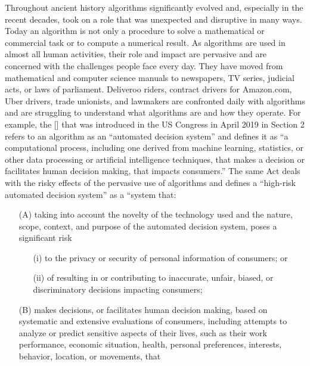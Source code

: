 {{{Throughout ancient history algorithms significantly evolved and, especially in the recent decades, took on a role that was unexpected and disruptive in many ways. Today an algorithm is not only a procedure to solve a mathematical or commercial task or to compute a numerical result. As algorithms are used in almost all human activities, their role and impact are pervasive and are concerned with the challenges people face every day. They have moved from mathematical and computer science manuals to newspapers, TV series, judicial acts, or laws of parliament. Deliveroo riders, contract drivers for Amazon.com, Uber drivers, trade unionists, and lawmakers are confronted daily with algorithms and are struggling to understand what algorithms are and how they operate. For example, the \hbox{\citeauthor{chap:01:AlgorithmicAccountabilityAct:2019}} [\citeyear{chap:01:AlgorithmicAccountabilityAct:2019}] that was introduced in the US Congress in April 2019 in Section 2 refers to an algorithm as an ``automated decision system'' and defines it as ``a computational process, including one derived from machine learning, statistics, or other data processing or artificial intelligence techniques, that makes a decision or facilitates human decision making, that impacts consumers.'' The same Act deals with the risky effects of the pervasive use of algorithms and defines a ``high-risk automated decision system'' as a ``system that:

\begin{enumerate}
\item[(A)]  taking into account the novelty of the technology used and the nature, scope, context, and purpose of the automated decision system, poses a significant risk

\begin{enumerate}
\item[(i)]  to the privacy or security of personal information of consumers; or
\item[(ii)]  of resulting in or contributing to inaccurate, unfair, biased, or discriminatory decisions impacting consumers;
\end{enumerate}
\item[(B)] makes decisions, or facilitates human decision making, based on systematic and extensive evaluations of consumers, including attempts to analyze or predict sensitive aspects of their lives, such as their work performance, economic situation, health, personal preferences, interests, behavior, location, or movements, that


\end{enumerate}}}}
